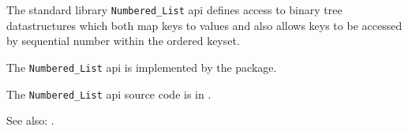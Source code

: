 
The standard library {\tt Numbered\_List} api defines access to binary tree 
datastructures which both map keys to values and also allows keys to 
be accessed by sequential number within the ordered keyset.

The {\tt Numbered\_List} api is implemented by the  package.

The {\tt Numbered\_List} api source code is in .

See also:  .

